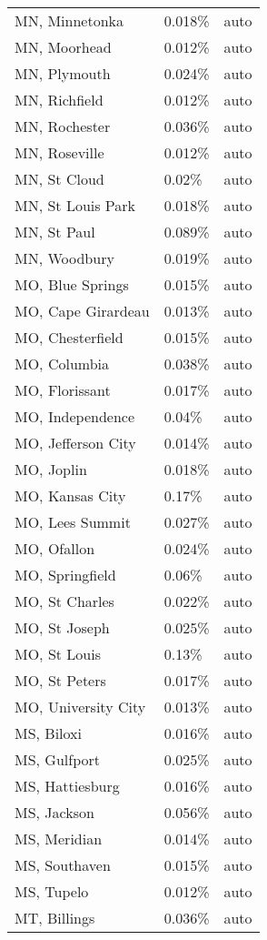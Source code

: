 \begin{longtable}[]{@{}lll@{}}
MN, Minnetonka & 0.018\% & auto \\
MN, Moorhead & 0.012\% & auto \\
MN, Plymouth & 0.024\% & auto \\
MN, Richfield & 0.012\% & auto \\
MN, Rochester & 0.036\% & auto \\
MN, Roseville & 0.012\% & auto \\
MN, St Cloud & 0.02\% & auto \\
MN, St Louis Park & 0.018\% & auto \\
MN, St Paul & 0.089\% & auto \\
MN, Woodbury & 0.019\% & auto \\
MO, Blue Springs & 0.015\% & auto \\
MO, Cape Girardeau & 0.013\% & auto \\
MO, Chesterfield & 0.015\% & auto \\
MO, Columbia & 0.038\% & auto \\
MO, Florissant & 0.017\% & auto \\
MO, Independence & 0.04\% & auto \\
MO, Jefferson City & 0.014\% & auto \\
MO, Joplin & 0.018\% & auto \\
MO, Kansas City & 0.17\% & auto \\
MO, Lees Summit & 0.027\% & auto \\
MO, Ofallon & 0.024\% & auto \\
MO, Springfield & 0.06\% & auto \\
MO, St Charles & 0.022\% & auto \\
MO, St Joseph & 0.025\% & auto \\
MO, St Louis & 0.13\% & auto \\
MO, St Peters & 0.017\% & auto \\
MO, University City & 0.013\% & auto \\
MS, Biloxi & 0.016\% & auto \\
MS, Gulfport & 0.025\% & auto \\
MS, Hattiesburg & 0.016\% & auto \\
MS, Jackson & 0.056\% & auto \\
MS, Meridian & 0.014\% & auto \\
MS, Southaven & 0.015\% & auto \\
MS, Tupelo & 0.012\% & auto \\
MT, Billings & 0.036\% & auto \\

\end{longtable}
